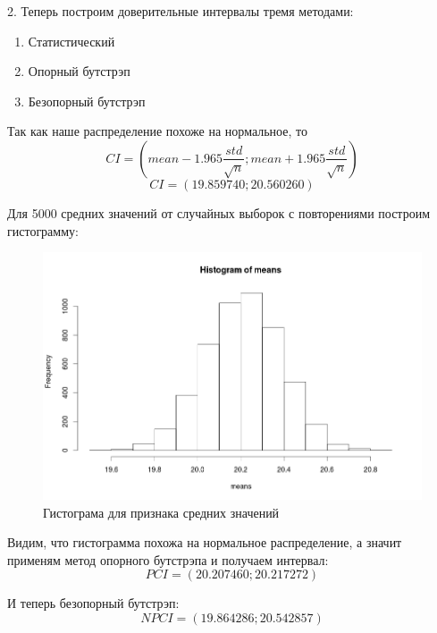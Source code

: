 \documentclass{article}
\begin{document}
2. Теперь построим доверительные интервалы тремя методами:
\begin{enumerate}
    \item Статистический
    \item Опорный бутстрэп
    \item Безопорный бутстрэп
\end{enumerate}

Так как наше распределение похоже на нормальное, то
$$CI = \left(mean - 1.965 \frac{std}{\sqrt{n}}; mean + 1.965 \frac{std}{\sqrt{n}}\right)$$
$$CI = (19.859740; 20.560260)$$

Для 5000 средних значений от случайных выборок с повторениями построим гистограмму:

\begin{figure}[H] 
\centering
\includegraphics[scale=0.4]{img/2_pivotal.png}
\caption{Гистограма для признака средних значений}
\label{fig :metka1}
\end{figure}

Видим, что гистограмма похожа на нормальное распределение, а значит применям метод опорного бутстрэпа и получаем интервал:
$$PCI = (20.207460; 20.217272)$$

И теперь безопорный бутстрэп:
$$NPCI = (19.864286; 20.542857)$$
\end{document}
